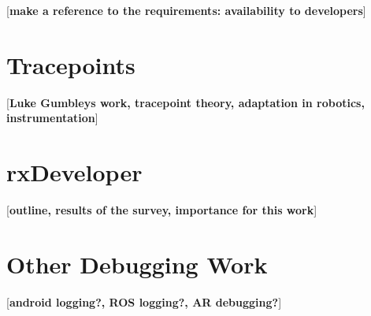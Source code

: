 [\textbf{make a reference to the requirements: availability to developers}]
\section{Tracepoints}
[\textbf{Luke Gumbleys work, tracepoint theory, adaptation in robotics, instrumentation}]
\cite{Gumbley2009}

\section{rxDeveloper}
[\textbf{outline, results of the survey, importance for this work}]
\cite{Muellers2012}

\section{Other Debugging Work}
[\textbf{android logging?, ROS logging?, AR debugging?}]

